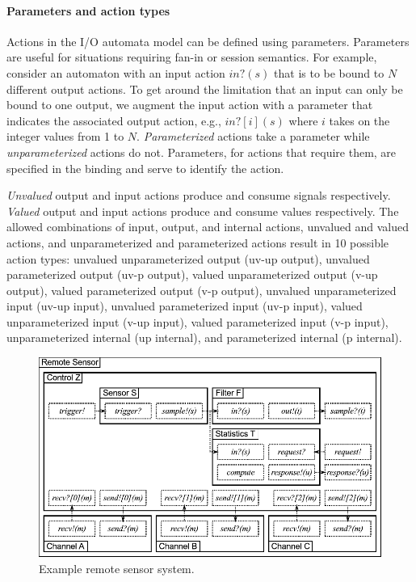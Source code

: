\paragraph*{Parameters and action types}
Actions in the I/O automata model can be defined using parameters.
Parameters are useful for situations requiring fan-in or session semantics.
For example, consider an automaton with an input action $in?(s)$ that is to be bound to $N$ different output actions.
To get around the limitation that an input can only be bound to one output, we augment the input action with a parameter that indicates the associated output action, e.g., $in?[i](s)$ where $i$ takes on the integer values from 1 to $N$.
\emph{Parameterized} actions take a parameter while \emph{unparameterized} actions do not.
Parameters, for actions that require them, are specified in the binding and serve to identify the action.

\emph{Unvalued} output and input actions produce and consume signals respectively.
\emph{Valued} output and input actions produce and consume values respectively.
The allowed combinations of input, output, and internal actions, unvalued and valued actions, and unparameterized and parameterized actions result in 10 possible action types:
unvalued unparameterized output (uv-up output),
unvalued parameterized output (uv-p output),
valued unparameterized output (v-up output),
valued parameterized output (v-p output),
unvalued unparameterized input (uv-up input),
unvalued parameterized input (uv-p input),
valued unparameterized input (v-up input),
valued parameterized input (v-p input),
unparameterized internal (up internal), and
parameterized internal (p internal).

\begin{figure}
\center
\includegraphics[width=\columnwidth]{example1}
\caption{Example remote sensor system.}
\label{example1}
\end{figure}

